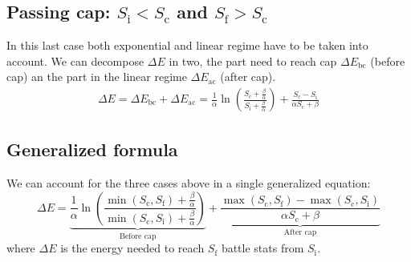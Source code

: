 \documentclass[12pt]{article}
\def\Sc{S_\text{c}}
\def\Si{S_\text{i}}
\def\Sf{S_\text{f}}
\begin{document}
\subsection{Passing cap: $\Si < \Sc$ and $\Sf > \Sc$}
In this last case both exponential and linear regime have to be taken into account.
We can decompose $\Delta E$ in two, the part need to reach cap $\Delta E_\text{bc}$ (before cap) an the part in the linear regime $\Delta E_\text{ac}$ (after cap).
\begin{equation}
    \begin{aligned}
        \Delta E = \Delta E_\text{bc} + \Delta E_\text{ac} = \frac{1}{\alpha} \ln\left( \frac{\Sc + \frac{\beta}{\alpha}}{\Si + \frac{\beta}{\alpha}} \right) + \frac{\Sc - \Si}{\alpha \Sc + \beta}
    \end{aligned}
\end{equation}
\subsection{Generalized formula}
We can account for the three cases above in a single generalized equation:
\begin{equation}
    \boxed{\Delta E = \underbrace{\frac{1}{\alpha} \ln\left( \frac{\min(\Sc, \Sf) + \frac{\beta}{\alpha}}{\min(\Sc, \Si) + \frac{\beta}{\alpha}} \right)}_\text{Before cap} + \underbrace{\frac{\max(\Sc, \Sf) - \max(\Sc, \Si)}{\alpha \Sc + \beta}}_\text{After cap}}
\end{equation}
where $\Delta E$ is the energy needed to reach $\Sf$ battle stats from $\Si$.
\end{document}
